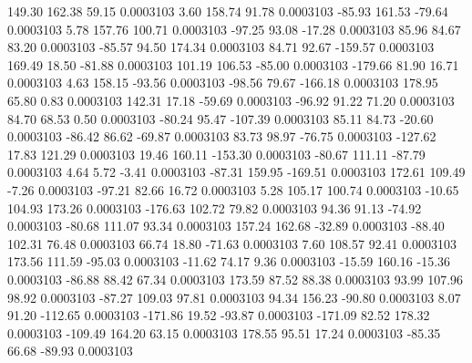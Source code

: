       149.30      162.38       59.15     0.0003103
        3.60      158.74       91.78     0.0003103
      -85.93      161.53      -79.64     0.0003103
        5.78      157.76      100.71     0.0003103
      -97.25       93.08      -17.28     0.0003103
       85.96       84.67       83.20     0.0003103
      -85.57       94.50      174.34     0.0003103
       84.71       92.67     -159.57     0.0003103
      169.49       18.50      -81.88     0.0003103
      101.19      106.53      -85.00     0.0003103
     -179.66       81.90       16.71     0.0003103
        4.63      158.15      -93.56     0.0003103
      -98.56       79.67     -166.18     0.0003103
      178.95       65.80        0.83     0.0003103
      142.31       17.18      -59.69     0.0003103
      -96.92       91.22       71.20     0.0003103
       84.70       68.53        0.50     0.0003103
      -80.24       95.47     -107.39     0.0003103
       85.11       84.73      -20.60     0.0003103
      -86.42       86.62      -69.87     0.0003103
       83.73       98.97      -76.75     0.0003103
     -127.62       17.83      121.29     0.0003103
       19.46      160.11     -153.30     0.0003103
      -80.67      111.11      -87.79     0.0003103
        4.64        5.72       -3.41     0.0003103
      -87.31      159.95     -169.51     0.0003103
      172.61      109.49       -7.26     0.0003103
      -97.21       82.66       16.72     0.0003103
        5.28      105.17      100.74     0.0003103
      -10.65      104.93      173.26     0.0003103
     -176.63      102.72       79.82     0.0003103
       94.36       91.13      -74.92     0.0003103
      -80.68      111.07       93.34     0.0003103
      157.24      162.68      -32.89     0.0003103
      -88.40      102.31       76.48     0.0003103
       66.74       18.80      -71.63     0.0003103
        7.60      108.57       92.41     0.0003103
      173.56      111.59      -95.03     0.0003103
      -11.62       74.17        9.36     0.0003103
      -15.59      160.16      -15.36     0.0003103
      -86.88       88.42       67.34     0.0003103
      173.59       87.52       88.38     0.0003103
       93.99      107.96       98.92     0.0003103
      -87.27      109.03       97.81     0.0003103
       94.34      156.23      -90.80     0.0003103
        8.07       91.20     -112.65     0.0003103
     -171.86       19.52      -93.87     0.0003103
     -171.09       82.52      178.32     0.0003103
     -109.49      164.20       63.15     0.0003103
      178.55       95.51       17.24     0.0003103
      -85.35       66.68      -89.93     0.0003103
